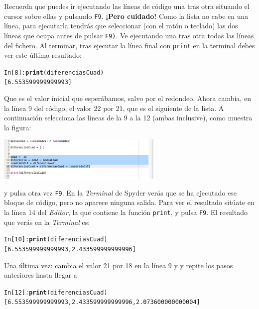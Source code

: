 \documentclass[10pt,a4paper]{article}\usepackage[]{graphicx}\usepackage[]{color}
\makeatletter
\newcommand{\hlkwd}[1]{\textcolor[rgb]{0.737,0.353,0.396}{\textbf{#1}}}%
\newenvironment{kframe}{%
 \def\at@end@of@kframe{}%
 \ifinner\ifhmode%
  \def\at@end@of@kframe{\end{minipage}}%
  \begin{minipage}{\columnwidth}%
 \fi\fi%
 \def\FrameCommand##1{\hskip\@totalleftmargin \hskip-\fboxsep
 \colorbox{shadecolor}{##1}\hskip-\fboxsep
     \hskip-\linewidth \hskip-\@totalleftmargin \hskip\columnwidth}%
 \MakeFramed {\advance\hsize-\width
   \@totalleftmargin\z@ \linewidth\hsize
   \@setminipage}}%
 {\par\unskip\endMakeFramed%
 \at@end@of@kframe}
\newenvironment{knitrout}{}{} %
\newcounter {cont01}
\makeatother
\begin{document}
Recuerda que puedes ir ejecutando las líneas de código una tras otra situando el cursor sobre ellas y pulsando {\tt F9}. {\bf ¡Pero cuidado!} Como la lista no cabe en una línea, para ejecutarla tendrás que seleccionar (con el ratón o teclado) las dos líneas que ocupa antes de pulsar {\tt F9)}.  Ve ejecutando una tras otra todas las líneas del fichero. Al terminar, tras ejecutar la línea final con {\tt print} en la terminal debes ver este último resultado:
\begin{knitrout}
\color{fgcolor}\begin{kframe}
\begin{alltt}
In [8]: \hlkwd{print}(diferenciasCuad)
[6.553599999999993]
\end{alltt}
\end{kframe}
\end{knitrout}
Que es el valor inicial que esperábamos, salvo por el redondeo. Ahora cambia, en la línea 9 del código, el valor 22 por 21, que es el siguiente de la lista. A continuación selecciona las líneas de la 9 a la 12 (ambas inclusive), como muestra la figura:
\begin{center}
\includegraphics[width=8cm]{../fig/Tut-02-py-33-SeleccionBloqueCodigo.png}
\end{center}
y pulsa otra vez {\tt F9}. En la {\em Terminal} de Spyder verás que se ha ejecutado ese bloque de código, pero no aparece ninguna salida. Para ver el resultado sitúate en la línea 14 del {\em Editor}, la que contiene la función {\tt print}, y pulsa {\tt F9}. El resultado que verás en la {\em Terminal} es:
\begin{knitrout}
\color{fgcolor}\begin{kframe}
\begin{alltt}
In [10]: \hlkwd{print}(diferenciasCuad)
[6.553599999999993, 2.433599999999996]
\end{alltt}
\end{kframe}
\end{knitrout}
Una última vez: cambia el valor 21 por 18 en la línea 9 y y repite los pasos anteriores hasta llegar a 
\begin{knitrout}
\color{fgcolor}\begin{kframe}
\begin{alltt}
In [12]: \hlkwd{print}(diferenciasCuad)
[6.553599999999993, 2.433599999999996, 2.073600000000004]
\end{alltt}
\end{kframe}
\end{knitrout}
\end{document}

